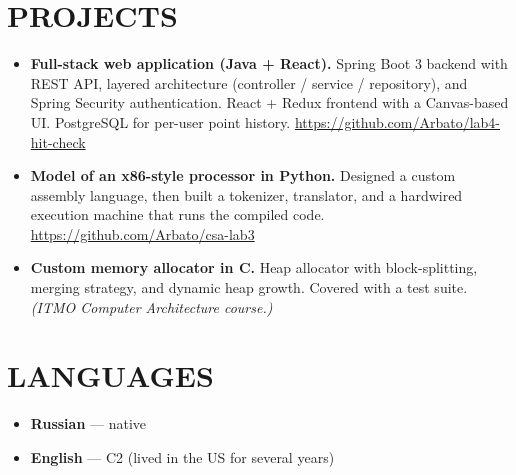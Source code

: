 \documentclass[paper=letter,fontsize=11pt]{scrartcl} %
\newcommand{\NewPart}[2]{\section*{\uppercase{#1} \small \normalfont #2}}
\begin{document}
\NewPart{Projects}{}

\begin{itemize}
    \item \textbf{Full-stack web application (Java + React).} Spring Boot 3 backend with REST API, layered architecture (controller / service / repository), and Spring Security authentication. React + Redux frontend with a Canvas-based UI. PostgreSQL for per-user point history. \url{https://github.com/Arbato/lab4-hit-check}

    \item \textbf{Model of an x86-style processor in Python.} Designed a custom assembly language, then built a tokenizer, translator, and a hardwired execution machine that runs the compiled code. \url{https://github.com/Arbato/csa-lab3}

    \item \textbf{Custom memory allocator in C.} Heap allocator with block-splitting, merging strategy, and dynamic heap growth. Covered with a test suite. \emph{(ITMO Computer Architecture course.)}
\end{itemize}

\NewPart{Languages}{}

\begin{itemize}
    \item \textbf{Russian} --- native
    \item \textbf{English} --- C2 (lived in the US for several years)
\end{itemize}
\end{document}

